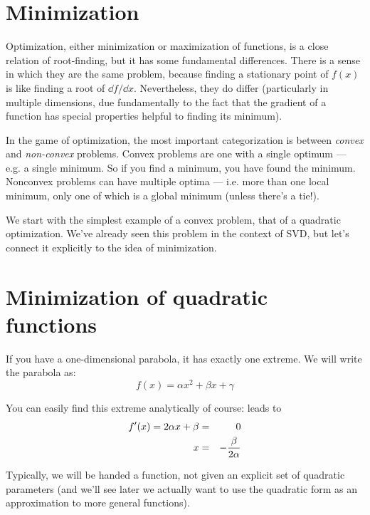 \section{Minimization}

Optimization, either minimization or maximization of functions, is a
close relation of root-finding, but it has some fundamental
differences. There is a sense in which they are the same problem,
because finding a stationary point of $f(x)$ is like finding a root of
$\dd{f}/\dd{x}$. Nevertheless, they do differ (particularly in
multiple dimensions, due fundamentally to the fact that the gradient
of a function has special properties helpful to finding its minimum).

In the game of optimization, the most important categorization is
between {\it convex} and {\it non-convex} problems. Convex problems
are one with a single optimum --- e.g. a single minimum. So if you
find a minimum, you have found the minimum. Nonconvex problems can
have multiple optima --- i.e. more than one local minimum, only one of
which is a global minimum (unless there's a tie!).

We start with the simplest example of a convex problem, that of a
quadratic optimization. We've already seen this problem in the context
of SVD, but let's connect it explicitly to the idea of minimization.

\section{Minimization of quadratic functions}

If you have a one-dimensional parabola, it has exactly one
extreme. We will write the parabola as:
\begin{equation}
f(x) = \alpha x^2 + \beta x + \gamma
\end{equation}


\begin{answer}
You can easily find this extreme analytically of course:
leads to
\begin{eqnarray}
f'(x) =  2 \alpha x + \beta  &=& 0 \cr
x  &=& - \frac{\beta}{2\alpha} \cr
\end{eqnarray}
\end{answer}

Typically, we will be handed a function, not given an explicit set of
quadratic parameters (and we'll see later we actually want to
use the quadratic form as an approximation to more general
functions). 

